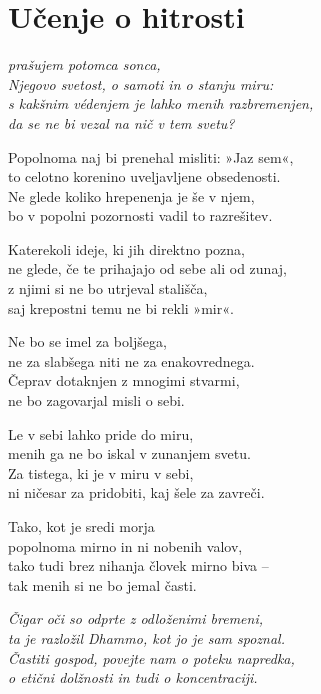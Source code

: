 \cleartorecto
{}
\chapter{Učenje o hitrosti}

\emph{prašujem potomca sonca,\\
Njegovo svetost, o samoti in o stanju miru:\\
s kakšnim védenjem je lahko menih razbremenjen,\\
da se ne bi vezal na nič v tem svetu?}

Popolnoma naj bi prenehal misliti: »Jaz sem«,\\
to celotno korenino uveljavljene obsedenosti.\\
Ne glede koliko hrepenenja je še v njem,\\
bo v popolni pozornosti vadil to razrešitev.

Katerekoli ideje, ki jih direktno pozna,\\
ne glede, če te prihajajo od sebe ali od zunaj,\\
z njimi si ne bo utrjeval stališča,\\
saj krepostni temu ne bi rekli »mir«.

Ne bo se imel za boljšega,\\
ne za slabšega niti ne za enakovrednega.\\
Čeprav dotaknjen z mnogimi stvarmi,\\
ne bo zagovarjal misli o sebi.

\clearpage

Le v sebi lahko pride do miru,\\
menih ga ne bo iskal v zunanjem svetu.\\
Za tistega, ki je v miru v sebi,\\
ni ničesar za pridobiti, kaj šele za zavreči.

Tako, kot je sredi morja\\
popolnoma mirno in ni nobenih valov,\\
tako tudi brez nihanja človek mirno biva --\\
tak menih si ne bo jemal časti.

\emph{Čigar oči so odprte z odloženimi bremeni,}\\
\emph{ta je razložil Dhammo, kot jo je sam spoznal.}\\
\emph{Častiti gospod, povejte nam o poteku napredka,}\\
\emph{o etični dolžnosti in tudi o koncentraciji.}

